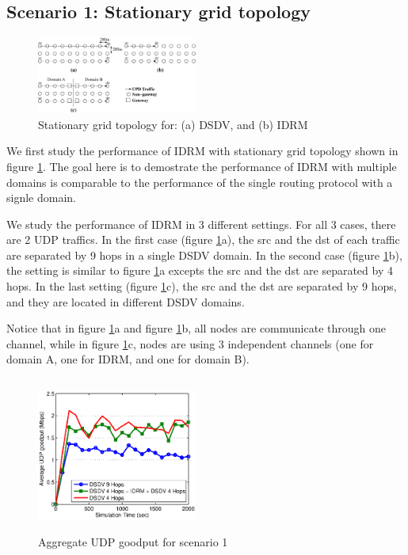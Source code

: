 \subsection{Scenario 1: Stationary grid topology}

\begin{figure}[htb!] 
\center
\includegraphics[width=0.47\textwidth]{figs/case1topo.eps}
\caption{Stationary grid topology for: (a) DSDV, and (b) IDRM} 
\label{fig:case1topo}
\end{figure}

We first study the performance of IDRM with
stationary grid topology shown in figure
\ref{fig:case1topo}. 
The goal here is to demostrate the performance of IDRM with multiple domains is
comparable to the performance of the single routing protocol with a signle domain.

We study the performance of IDRM in 3 different settings.
For all 3 cases, there are 2 UDP traffics.
In the first case (figure \ref{fig:case1topo}a), 
the src and the dst of each traffic are separated by 9 hops in a single DSDV domain.
In the second case (figure \ref{fig:case1topo}b), 
the setting is similar to figure \ref{fig:case1topo}a excepts
the src and the dst are separated by 4 hops.
In the last setting (figure \ref{fig:case1topo}c), 
the src and the dst are separated by 9 hops, and they are located in different DSDV domains.

Notice that in figure \ref{fig:case1topo}a and 
figure \ref{fig:case1topo}b, 
all nodes are communicate through one channel, 
while in figure \ref{fig:case1topo}c, 
nodes are using 3 independent channels 
(one for domain A, one for IDRM, and one for domain B). 

\begin{figure}[htb!] 
\center
\includegraphics[width=0.47\textwidth, height=2.0in]{figs/case1DSDV.eps}
\caption{Aggregate UDP goodput for scenario 1}
\label{fig:case1udp}
\end{figure}

